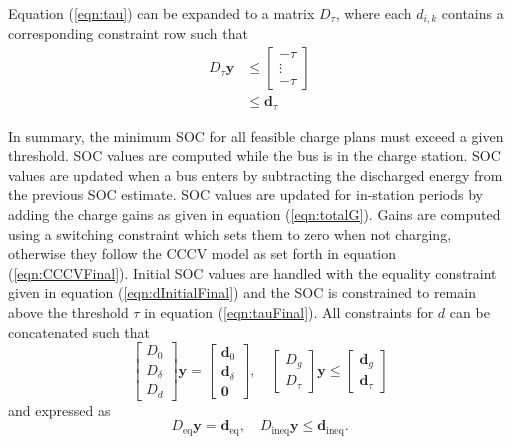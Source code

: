 Equation (\ref{eqn:tau}) can be expanded to a matrix $D_\tau$, where each $d_{i,k}$ contains a corresponding constraint row such that
\begin{equation}\label{eqn:tauFinal}
	\begin{aligned}
		D_\tau\mathbf{y} & \le \begin{bmatrix}-\tau \\ \vdots \\ -\tau \end{bmatrix} \\
		       & \le \mathbf{d}_\tau
	\end{aligned}
\end{equation}
\par In summary, the minimum SOC for all feasible charge plans must
exceed a given threshold.  SOC values are computed while the bus is in
the charge station.  SOC values are updated when a bus enters by
subtracting the discharged energy from the previous SOC estimate. SOC
values are updated for in-station periods by adding the charge gains
as given in equation (\ref{eqn:totalG}).  Gains are computed using a
switching constraint which sets them to zero when not charging,
otherwise they follow the CCCV model as set forth in equation
(\ref{eqn:CCCVFinal}). Initial SOC values are handled with the equality
constraint given in equation (\ref{eqn:dInitialFinal}) and the SOC is
constrained to remain above the threshold $\tau$ in equation
(\ref{eqn:tauFinal}). All constraints for $d$ can be concatenated such
that
\begin{equation}
	\begin{bmatrix}
	D_0 \\
	D_\delta \\
	D_d
	\end{bmatrix} \mathbf{y} = 
	\begin{bmatrix}
		\mathbf{d}_0 \\
		\mathbf{d}_\delta \\
		\mathbf{0}
		\end{bmatrix}, \quad \begin{bmatrix} D_g \\ D_\tau \end{bmatrix}\mathbf{y} \le \begin{bmatrix} \mathbf{d}_g \\ \mathbf{d}_\tau \end{bmatrix}
\end{equation}
and expressed as 
	\begin{equation}\label{eqn:cSocFinal}
	D_{\text{eq}}\mathbf{y} = \mathbf{d}_{\text{eq}}, \quad D_{\text{ineq}} \mathbf{y} \le \mathbf{d}_{\text{ineq}}.
\end{equation}
